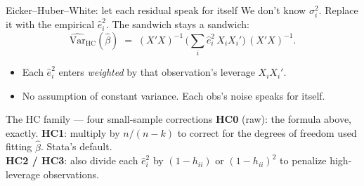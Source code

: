 \documentclass[aspectratio=169,11pt]{beamer}
\begin{document}
\begin{frame}{Eicker--Huber--White: let each residual speak for itself}
\vspace{0.4em}
We don't know $\sigma_i^2$. Replace it with the empirical $\hat e_i^2$. The sandwich stays a sandwich:
\vspace{-0.2em}
\[
\widehat{\text{Var}}_{\text{HC}}(\hat\beta) \;=\; (X'X)^{-1}\, \bigg(\sum_i \hat e_i^2\, X_i X_i'\bigg)\, (X'X)^{-1}.
\]
\vspace{0.1em}
\begin{itemize}\small
  \item Each $\hat e_i^2$ enters \textit{weighted} by that observation's leverage $X_iX_i'$.
  \item No assumption of constant variance. Each obs's noise speaks for itself.
\end{itemize}
\vspace{0.3em}
\begin{block}{The HC family --- four small-sample corrections}
\footnotesize
\textbf{HC0} (raw): the formula above, exactly. \;
\textbf{HC1}: multiply by $n/(n-k)$ to correct for the degrees of freedom used fitting $\hat\beta$. Stata's default. \\
\textbf{HC2 / HC3}: also divide each $\hat e_i^2$ by $(1-h_{ii})$ or $(1-h_{ii})^2$ to penalize high-leverage observations. \\
\end{block}
\end{frame}
\end{document}
